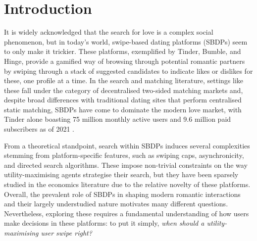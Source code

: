 \section{Introduction}
\label{sec:section1}
It is widely acknowledged that the search for love is a complex social phenomenon, but in today's world, swipe-based dating platforms (SBDPs) seem to only make it trickier.
These platforms, exemplified by Tinder, Bumble, and Hinge, provide a gamified way of browsing through potential romantic partners by swiping through a stack of suggested candidates to indicate likes or dislikes for these, one profile at a time.  
In the search and matching literature, settings like these fall under the category of decentralised two-sided matching markets \citep{kanoria2021facilitating} and, despite broad differences with traditional dating sites that perform centralised static matching, SBDPs have come to dominate the modern love market, with Tinder alone boasting 75 million monthly active users and 9.6 million paid subscribers as of 2021 \citep{web:tinder_stats}.

From a theoretical standpoint, search within SBDPs induces several complexities stemming from platform-specific features, such as swiping caps, asynchronicity, and directed search algorithms.
These impose non-trivial constraints on the way utility-maximising agents strategise their search, but they have been sparsely studied in the economics literature due to the relative novelty of these platforms.
Overall, the prevalent role of SBDPs in shaping modern romantic interactions and their largely understudied nature motivates many different questions.
Nevertheless, exploring these requires a fundamental understanding of how users make decisions in these platforms: to put it simply, \textit{when should a utility-maximising user swipe right?}

